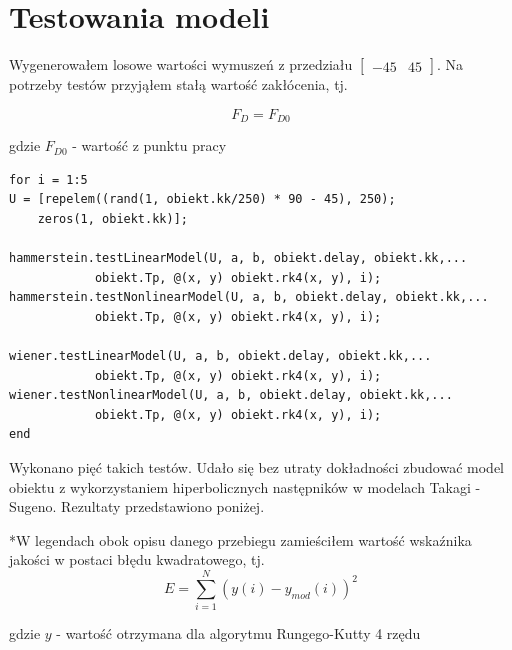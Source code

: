 \chapter{Testowania modeli}
Wygenerowałem losowe wartości wymuszeń z przedziału $\begin{bmatrix} -45 & 45 \end{bmatrix}$. Na potrzeby testów przyjąłem stałą wartość zakłócenia, tj.

\begin{equation}
F_D = F_{D0}
\end{equation} 

\noindent gdzie $F_{D0}$ - wartość z punktu pracy
\begin{lstlisting}[style=Matlab-editor]
for i = 1:5
U = [repelem((rand(1, obiekt.kk/250) * 90 - 45), 250); 
	zeros(1, obiekt.kk)];
    
hammerstein.testLinearModel(U, a, b, obiekt.delay, obiekt.kk,...
			obiekt.Tp, @(x, y) obiekt.rk4(x, y), i);
hammerstein.testNonlinearModel(U, a, b, obiekt.delay, obiekt.kk,...
			obiekt.Tp, @(x, y) obiekt.rk4(x, y), i);
    
wiener.testLinearModel(U, a, b, obiekt.delay, obiekt.kk,...
			obiekt.Tp, @(x, y) obiekt.rk4(x, y), i);
wiener.testNonlinearModel(U, a, b, obiekt.delay, obiekt.kk,...
			obiekt.Tp, @(x, y) obiekt.rk4(x, y), i);
end
\end{lstlisting}

\noindent Wykonano pięć takich testów. Udało się bez utraty dokładności zbudować model obiektu z wykorzystaniem hiperbolicznych następników w modelach Takagi - Sugeno. Rezultaty przedstawiono poniżej.

*W legendach obok opisu danego przebiegu zamieściłem wartość wskaźnika jakości w postaci błędu kwadratowego, tj. 
\begin{equation}
E = \sum_{i=1}^{N} (y(i) - y_{mod}(i))^2
\end{equation} 

\noindent gdzie $y$ - wartość otrzymana dla algorytmu Rungego-Kutty 4 rzędu

\newpage


